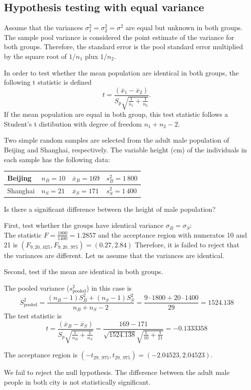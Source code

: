 \subsection{Hypothesis testing with equal variance} 
\label{NTequalV}
   Assume that the variances $\sigma_1^2 = \sigma_2^2 = \sigma^2$ are equal but
unknown in both groups.  The sample pool variance is considered the point estimate of the variance for both groups. Therefore, the standard error is the  pool standard error  multiplied by the square root of $1/n_1$ plux $1/n_2$. 

In order to test whether the mean population are identical in both groups, the following t statistic is defined 
 $$ t=
  \frac{(\overline{x}_1-\overline{x}_2)}
  {S_p\sqrt{\frac{1}{n_1}+\frac{1}{n_2}}}.
  $$  
If the mean population are equal in both group, this test statistic
follows a Student's t distibution with degree of freedom $n_1+n_2-2$. 

\begin{examplewrap}
\begin{nexample}{
 Two simple random samples are selected from the adult male population of Beijing
  and Shanghai, respectively. The variable height (cm) of the individuals in each
  sample has the following data: \newline 
  \begin{tabular}{l|l|l|l}
    Beijing & $n_B=10$ & $\overline{x}_B=169$ & $s_B^2=1\,800$ \\
  \hline  Shanghai & $n_S=21$ & $\overline{x}_S=171$ & $s_S^2=1\,400$ \\
  \end{tabular}  
  \newline
Is there a significant difference between the height of male
population?
}
First, test whether the groups have identical variance $\sigma_B=\sigma_S$:\\
The statistic  $F=\frac{1800}{1400}=1.2857$ and the  
 acceptance region with numeratos 10 and 21  is  $(F_{9,20,.025},F_{9,20,.975})=(0.27,2.84) $
Therefore, it is  failed to reject that the variances are different. Let us assume that
the variances are identical.  
  
Second, test if the mean are identical in both groups. 

The pooled variance ($s^2_{\mbox{pooled}}$) in this case is 
$$S_{\mbox{pooled}}^2 = \frac{(n_B-1)S_B^2+(n_S-1)S_S^2}{n_B+n_S-2}= \frac{9\cdot
  1800+20\cdot 1400}{29}=1524.138$$
The test statistic is 
$$
t=
\frac{(\overline{x}_B-\overline{x}_S)}
  {S_p\sqrt{\frac{1}{n_B}+\frac{1}{n_S}}}
=\frac{169-171}{\sqrt{1524.138}\sqrt{\frac{1}{10}+\frac{1}{21}}}=-0.1333358
$$  

The acceptance region is
$(-t_{29,.975},t_{29,.975})=(-2.04523,2.04523)$.

We fail to reject the null hypothesis. The difference between the
adult male people in both city is not
statistically significant.  
\end{nexample}
\end{examplewrap}

